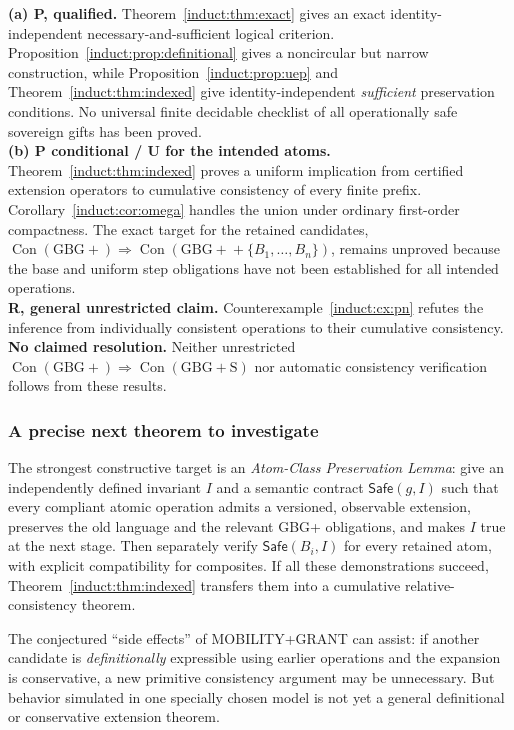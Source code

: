 \documentclass[11pt,letterpaper]{article}
\theoremstyle{definition}\newtheorem{definition}[theorem]{Definition}\newtheorem{example}[theorem]{Example}
\theoremstyle{remark}\newtheorem{remark}[theorem]{Remark}
\newcommand{\Con}{\operatorname{Con}}
\providecommand{\Gb}{\mathrm{GBG+}}
\providecommand{\GG}{\mathrm{GBG+S}}
\begin{document}
\begin{tcolorbox}[colback=gray!6,colframe=gray!45,boxrule=0.5pt,arc=1mm,title={\bfseries Settlement record}]
\textbf{(a) P, qualified.} Theorem~\ref{induct:thm:exact} gives an exact identity-independent necessary-and-sufficient logical criterion. Proposition~\ref{induct:prop:definitional} gives a noncircular but narrow construction, while Proposition~\ref{induct:prop:uep} and Theorem~\ref{induct:thm:indexed} give identity-independent \emph{sufficient} preservation conditions. No universal finite decidable checklist of all operationally safe sovereign gifts has been proved.\\[5pt]
\textbf{(b) P conditional / U for the intended atoms.} Theorem~\ref{induct:thm:indexed} proves a uniform implication from certified extension operators to cumulative consistency of every finite prefix. Corollary~\ref{induct:cor:omega} handles the union under ordinary first-order compactness. The exact target for the retained candidates, \(\Con(\Gb)\Rightarrow\Con(\Gb+\{B_1,\ldots,B_n\})\), remains unproved because the base and uniform step obligations have not been established for all intended operations.\\[5pt]
\textbf{R, general unrestricted claim.} Counterexample~\ref{induct:cx:pn} refutes the inference from individually consistent operations to their cumulative consistency.\\[5pt]
\textbf{No claimed resolution.} Neither unrestricted \(\Con(\Gb)\Rightarrow\Con(\GG)\) nor automatic consistency verification follows from these results.
\end{tcolorbox}

\subsubsection{A precise next theorem to investigate}

The strongest constructive target is an \emph{Atom-Class Preservation Lemma}: give an independently defined invariant \(I\) and a semantic contract \(\mathsf{Safe}(g,I)\) such that every compliant atomic operation admits a versioned, observable extension, preserves the old language and the relevant GBG+ obligations, and makes \(I\) true at the next stage. Then separately verify \(\mathsf{Safe}(B_i,I)\) for every retained atom, with explicit compatibility for composites. If all these demonstrations succeed, Theorem~\ref{induct:thm:indexed} transfers them into a cumulative relative-consistency theorem.

The conjectured ``side effects'' of MOBILITY+GRANT can assist: if another candidate is \emph{definitionally} expressible using earlier operations and the expansion is conservative, a new primitive consistency argument may be unnecessary. But behavior simulated in one specially chosen model is not yet a general definitional or conservative extension theorem.
\end{document}
